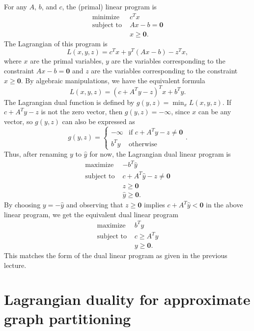 \documentclass[11pt]{article}
\newcommand{\0}{\mathbf{0}}
\newcommand{\1}{\mathbf{1}}
\begin{document}
For any $A$, $b$, and $c$, the (primal) linear program is
\begin{align*}
  \text{minimize } & c^T x \\
  \text{subject to } & A x - b = \0 \\
  & x \geq \0.
\end{align*}
The Lagrangian of this program is
\begin{equation*}
  L(x, y, z) = c^T x + y^T (A x - b) - z^T x,
\end{equation*}
where $x$ are the primal variables, $y$ are the variables corresponding to the constraint $A x - b = \0$ and $z$ are the variables corresponding to the constraint $x \geq \0$.
By algebraic manipulations, we have the equivalent formula
\begin{equation*}
  L(x, y, z) = (c + A^T y - z)^T x + b^T y.
\end{equation*}
The Lagrangian dual function is defined by $g(y, z) = \min_x L(x, y, z)$.
If $c + A^T y - z$ is not the zero vector, then $g(y, z) = -\infty$, since $x$ can be any vector, so $g(y, z)$ can also be expressed as
\begin{equation*}
  g(y, z) =
  \begin{cases}
    -\infty & \text{if } c + A^T y - z \neq \0 \\
    b^T y & \text{otherwise}
  \end{cases}.
\end{equation*}
Thus, after renaming $y$ to $\hat{y}$ for now, the Lagrangian dual linear program is
\begin{align*}
  \text{maximize } & -b^T \hat{y} \\
  \text{subject to } & c + A^T \hat{y} - z \neq \0 \\
  & z \geq \0 \\
  & \hat{y} \geq \0.
\end{align*}
By choosing $y = -\hat{y}$ and observing that $z \geq \0$ implies $c + A^T \hat{y} < \0$ in the above linear program, we get the equivalent dual linear program
\begin{align*}
  \text{maximize } & b^T y \\
  \text{subject to } & c \geq A^T y \\
  & y \geq \0.
\end{align*}
This matches the form of the dual linear program as given in the previous lecture.

\section{Lagrangian duality for approximate graph partitioning}
\end{document}
